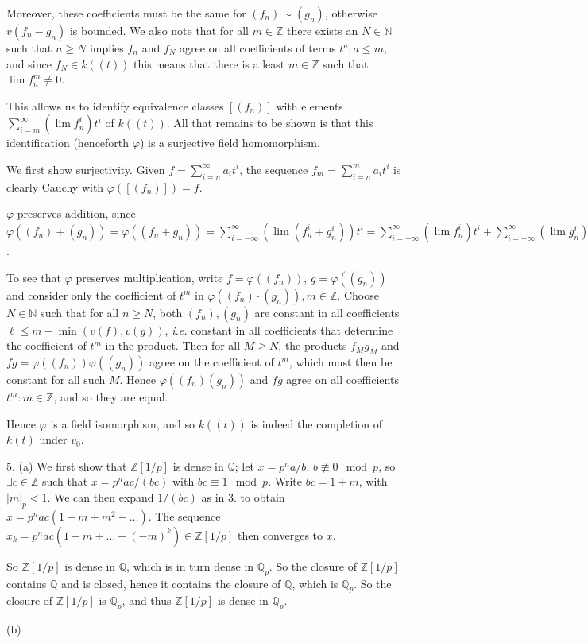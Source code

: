 \documentclass[]{article}
\theoremstyle{custhm}
\theoremstyle{cusdef}
\theoremstyle{custhm}
\theoremstyle{custhm}
\theoremstyle{custhm}
\theoremstyle{custhm}
\theoremstyle{cusdef}
\theoremstyle{remark}
\newcommand{\N}{\mathbb{N}}
\newcommand{\Z}{\mathbb{Z}}
\newcommand{\Q}{\mathbb{Q}}
\renewcommand{\it}[1]{\textit{#1}}
\renewcommand{\phi}{\varphi}
\begin{document}
Moreover, these coefficients must be the same for $(f_n)\sim (g_n)$, otherwise $v(f_n-g_n)$ is bounded. We also note that for all $m\in\Z$ there exists an $N\in\N$ such that $n\ge N$ implies $f_n$ and $f_N$ agree on all coefficients of terms $t^a:a\le m$, and since $f_N\in k((t))$ this means that there is a least $m\in\Z$ such that $\lim f_n^m \ne 0$.

This allows us to identify equivalence classes $[(f_n)]$ with elements $\sum_{i=m}^{\infty}(\lim f_n^i)t^i$ of $k((t))$. All that remains to be shown is that this identification (henceforth $\phi$) is a surjective field homomorphism.

We first show surjectivity. Given $f = \sum_{i=n}^{\infty}a_it^i$, the sequence $f_m = \sum_{i=n}^{m}a_it^i$ is clearly Cauchy with $\phi([(f_n)]) = f$.

$\phi$ preserves addition, since $\phi((f_n)+(g_n)) = \phi((f_n+g_n)) = \sum_{i=-\infty}^{\infty}(\lim(f_n^i+g_n^i))t^i = \sum_{i=-\infty}^{\infty}(\lim f_n^i)t^i +\sum_{i=-\infty}^{\infty}(\lim g_n^i)t^i = \phi((f_n)) + \phi((g_n))$.

To see that $\phi$ preserves multiplication, write $f =\phi((f_n))$, $g = \phi((g_n))$ and  consider only the coefficient of $t^m$ in $\phi((f_n)\cdot(g_n)), m\in\Z$. Choose $N\in\N$ such that for all $n\ge N$, both $(f_n),(g_n)$ are constant in all coefficients $\ell \le m - \min(v(f),v(g))$, \it{i.e.} constant in all coefficients that determine the coefficient of $t^m$ in the product. Then for all $M\ge N$, the products $f_Mg_M$ and $fg=\phi((f_n))\phi((g_n))$ agree on the coefficient of $t^m$, which must then be constant for all such $M$. Hence $\phi((f_n)(g_n))$ and $fg$ agree on all coefficients $t^m:m\in\Z$, and so they are equal.

Hence $\phi$ is a field isomorphism, and so $k((t))$ is indeed the completion of $k(t)$ under $v_0$.

5. (a) We first show that $\Z[1/p]$ is dense in $\Q$; let $x = p^na/b$. $b\not\equiv 0\mod p$, so $\exists c\in\Z$ such that $x = p^nac/(bc)$ with $bc\equiv 1\mod p$. Write $bc = 1 + m$, with $|m|_p < 1$. We can then expand $1/(bc)$ as in 3. to obtain $x = p^nac(1-m+m^2-\dots)$. The sequence $x_k = p^nac(1-m+\dots +(-m)^k)\in\Z[1/p]$ then converges to $x$.

So $\Z[1/p]$ is dense in $\Q$, which is in turn dense in $\Q_p$. So the closure of $\Z[1/p]$ contains $\Q$ and is closed, hence it contains the closure of $\Q$, which is $\Q_p$. So the closure of $\Z[1/p]$ is $\Q_p$, and thus $\Z[1/p]$ is dense in $\Q_p$.

(b)
\end{document}
